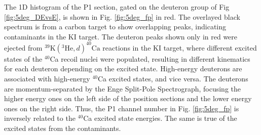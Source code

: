 The 1D histogram of the P1 section, gated on the deuteron group of Fig \ref{fig:5deg_DEvsE}, is shown in Fig. \ref{fig:5deg_fp} in red. The overlayed black spectrum is from a carbon target to show overlapping peaks, indicating contaminants in the KI target. The deuteron peaks shown only in red were ejected from $^{39}\mathrm{K}(^{3}\mathrm{He},d)^{40}\mathrm{Ca}$ reactions in the KI target, where different excited states of the $^{40}$Ca recoil nuclei were populated, resulting in different kinematics for each deuteron depending on the excited state. High-energy deuterons are associated with high-energy $^{40}$Ca excited states, and vice versa. The deuterons are momentum-separated by the Enge Split-Pole Spectrograph, focusing the higher energy ones on the left side of the position sections and the lower energy ones on the right side. Thus, the P1 channel number in Fig. \ref{fig:5deg_fp} is inversely related to the $^{40}$Ca excited state energies. The same is true of the excited states from the contaminants.

\def\yTS{0.72}
\def\xTS{2.12}


